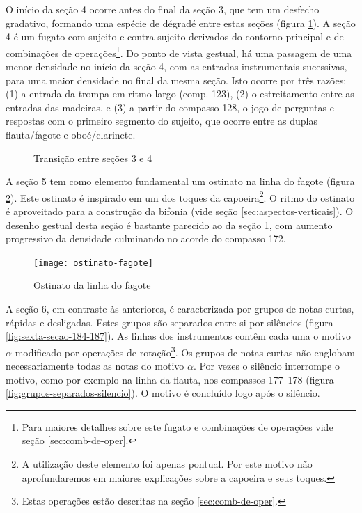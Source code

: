 O início da seção 4 ocorre antes do final da seção 3, que tem um
desfecho gradativo, formando uma espécie de dégradé entre estas seções
(figura \ref{fig:transicao-3-4}). A seção 4 é um fugato com sujeito e
contra-sujeito derivados do contorno principal e de combinações de
operações\footnote{Para maiores detalhes sobre este fugato e
  combinações de operações vide seção \ref{sec:comb-de-oper}.}. Do
ponto de vista gestual, há uma passagem de uma menor densidade no
início da seção 4, com as entradas instrumentais sucessivas, para uma
maior densidade no final da mesma seção. Isto ocorre por três razões:
(1) a entrada da trompa em ritmo largo (comp. 123), (2) o
estreitamento entre as entradas das madeiras, e (3) a partir do
compasso 128, o jogo de perguntas e respostas com o primeiro segmento
do sujeito, que ocorre entre as duplas flauta/fagote e oboé/clarinete.

\begin{figure}
  \centering
  \caption{Transição entre seções 3 e 4}
  \label{fig:transicao-3-4}
\end{figure}

A seção 5 tem como elemento fundamental um ostinato na linha do fagote
(figura \ref{fig:ostinato-fagote}). Este ostinato é inspirado em um
dos toques da capoeira\footnote{A utilização deste elemento foi apenas
  pontual. Por este motivo não aprofundaremos em maiores explicações
  sobre a capoeira e seus toques.}. O ritmo do ostinato é aproveitado
para a construção da bifonia (vide seção
\ref{sec:aspectos-verticais}). O desenho gestual desta seção é
bastante parecido ao da seção 1, com aumento progressivo da densidade
culminando no acorde do compasso 172.

\begin{figure}
  \centering
  \texttt{[image: ostinato-fagote]}
  \caption{Ostinato da linha do fagote}
  \label{fig:ostinato-fagote}
\end{figure}

A seção 6, em contraste às anteriores, é caracterizada por grupos de
notas curtas, rápidas e desligadas. Estes grupos são separados entre
si por silêncios (figura \ref{fig:sexta-secao-184-187}). As linhas dos
instrumentos contêm cada uma o motivo $\alpha$ modificado por
operações de rotação\footnote{Estas operações estão descritas na seção
  \ref{sec:comb-de-oper}.}. Os grupos de notas curtas não englobam
necessariamente todas as notas do motivo $\alpha$. Por vezes o
silêncio interrompe o motivo, como por exemplo na linha da flauta, nos
compassos 177--178 (figura \ref{fig:grupos-separados-silencio}). O
motivo é concluído logo após o silêncio.

